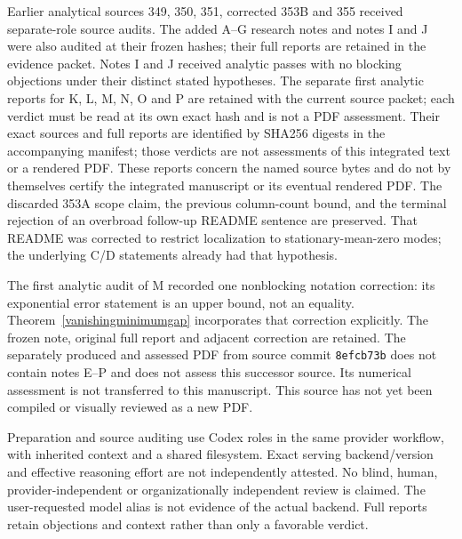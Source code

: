 \documentclass[11pt]{article}
\begin{document}
Earlier analytical sources 349, 350, 351, corrected 353B and 355 received separate-role source audits. The added A--G research notes and notes I and J were also audited at their frozen hashes; their full reports are retained in the evidence packet. Notes I and J received analytic passes with no blocking objections under their distinct stated hypotheses. The separate first analytic reports for K, L, M, N, O and P are retained with the current source packet; each verdict must be read at its own exact hash and is not a PDF assessment. Their exact sources and full reports are identified by SHA256 digests in the accompanying manifest; those verdicts are not assessments of this integrated text or a rendered PDF. These reports concern the named source bytes and do not by themselves certify the integrated manuscript or its eventual rendered PDF. The discarded 353A scope claim, the previous column-count bound, and the terminal rejection of an overbroad follow-up README sentence are preserved. That README was corrected to restrict localization to stationary-mean-zero modes; the underlying C/D statements already had that hypothesis.

The first analytic audit of M recorded one nonblocking notation correction:
its exponential error statement is an upper bound, not an equality.
Theorem~\ref{vanishingminimumgap} incorporates that correction explicitly.
The frozen note, original full report and adjacent correction are retained.
The separately produced and assessed PDF from source commit \texttt{8efcb73b}
does not contain notes E--P and does not assess this successor source.
Its numerical assessment is not transferred to this manuscript. This source
has not yet been compiled or visually reviewed as a new PDF.

Preparation and source auditing use Codex roles in the same provider workflow, with inherited context and a shared filesystem. Exact serving backend/version and effective reasoning effort are not independently attested. No blind, human, provider-independent or organizationally independent review is claimed. The user-requested model alias is not evidence of the actual backend. Full reports retain objections and context rather than only a favorable verdict.
\end{document}
